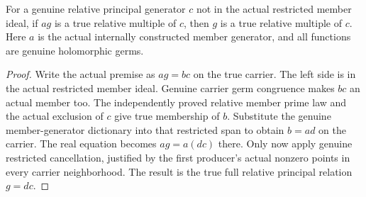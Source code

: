 \begin{lemma}
\label{hir:sharp-actual-relative-principal-divisor-cancellation}
\leanok
For a genuine relative principal generator $c$ not in the actual restricted
member ideal, if $a g$ is a true relative multiple of $c$, then $g$ is a
true relative multiple of $c$. Here $a$ is the actual internally constructed
member generator, and all functions are genuine holomorphic germs.
\end{lemma}
\begin{proof}
Write the actual premise as $a g=b c$ on the true carrier. The left side is
in the actual restricted member ideal. Genuine carrier germ congruence makes
$b c$ an actual member too. The independently proved relative member prime
law and the actual exclusion of $c$ give true membership of $b$. Substitute
the genuine member-generator dictionary into that restricted span to obtain
$b=a d$ on the carrier. The real equation becomes $a g=a(d c)$ there.
Only now apply genuine restricted cancellation, justified by the first
producer's actual nonzero points in every carrier neighborhood. The result
is the true full relative principal relation $g=d c$.
\end{proof}

